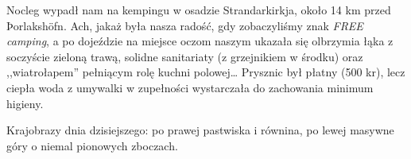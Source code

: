 
Nocleg wypadł nam na kempingu w osadzie Strandarkirkja, około 14 km przed Þorlakshöfn. Ach, jakaż była nasza radość, gdy zobaczyliśmy znak \emph{FREE camping}, a po dojeździe na miejsce oczom naszym ukazała się olbrzymia łąka z soczyście zieloną trawą, solidne sanitariaty (z grzejnikiem w środku) oraz ,,wiatrołapem'' pełniącym rolę kuchni polowej… Prysznic był płatny (500 kr), lecz ciepła woda z umywalki w zupełności wystarczała do zachowania minimum higieny.

Krajobrazy dnia dzisiejszego: po prawej pastwiska i równina, po lewej masywne góry o niemal pionowych zboczach.

